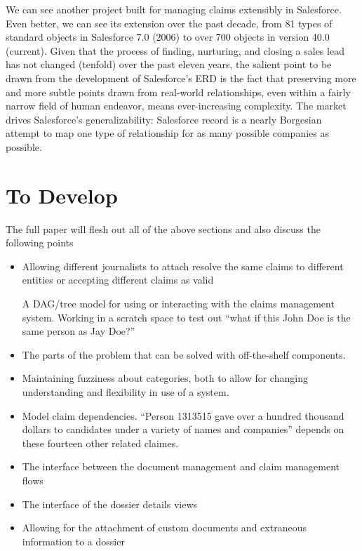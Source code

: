 \documentclass[format=siggraph, review=true]{acmart}
\begin{document}
We can see another project built for managing claims extensibly in Salesforce. Even better, we can see its extension over the past decade, from 81 types of standard objects in Salesforce 7.0 (2006) to over 700 objects in version 40.0 (current). Given that the process of finding, nurturing, and closing a sales lead has not changed (tenfold) over the past eleven years, the salient point to be drawn from the development of Salesforce's ERD is the fact that preserving more and more subtle points drawn from real-world relationships, even within a fairly narrow field of human endeavor, means ever-increasing complexity. The market drives Salesforce's generalizability: Salesforce record is a nearly Borgesian attempt to map one type of relationship for as many possible companies as possible.


\section{To Develop}
The full paper will flesh out all of the above sections and also discuss
the following points

\begin{itemize}
  \item Allowing different journalists to attach resolve the same
    claims to different entities or accepting different claims as
    valid

    A DAG/tree model for using or interacting with the claims management system. Working in a scratch space to test out ``what if this John Doe is the same person as Jay Doe?''
  \item The parts of the problem that can be solved with off-the-shelf components.
  \item Maintaining fuzziness about categories, both to allow for changing understanding and flexibility in use of a system.
  \item Model claim dependencies. ``Person 1313515 gave over a hundred thousand dollars to candidates under a variety of names and companies'' depends on these fourteen other related claimes.
  \item The interface between the document management and claim
    management flows
  \item The interface of the dossier details views
  \item Allowing for the attachment of custom documents and extraneous
    information to a dossier
\end{itemize}
\end{document}
